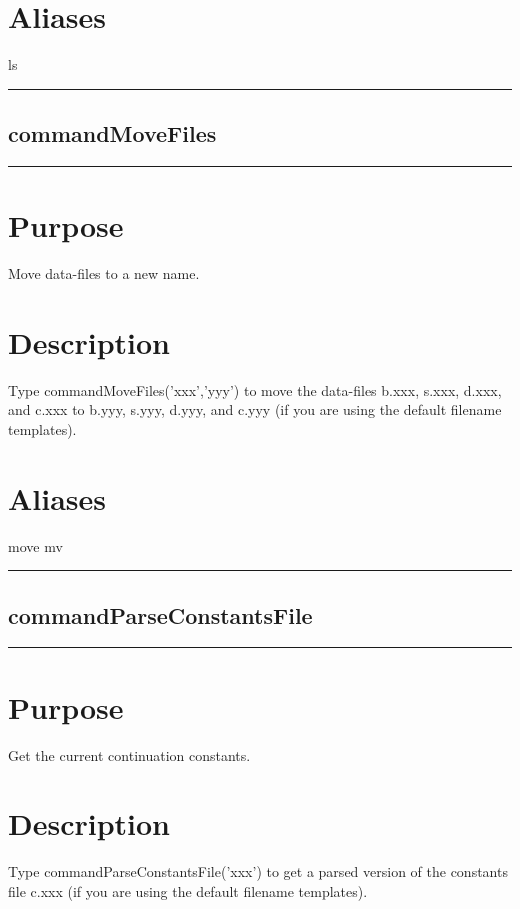 \documentclass[12pt]{report}
\begin{document}
\begin{minipage}{6in}
    \section*{Aliases}
ls \medskip\hrule\end{minipage}\subsection{commandMoveFiles} \label{sec:clui_ref_commandMoveFiles}\begin{minipage}{6in}\hrule\medskip\section*{Purpose}
Move data-files to a new name.\section*{Description}

    Type commandMoveFiles('xxx','yyy') to move the data-files b.xxx, s.xxx, d.xxx,
    and c.xxx to b.yyy, s.yyy, d.yyy, and c.yyy (if you are using the
    default filename templates).  \section*{Aliases}
move mv \medskip\hrule\end{minipage}\subsection{commandParseConstantsFile} \label{sec:clui_ref_commandParseConstantsFile}\begin{minipage}{6in}\hrule\medskip\section*{Purpose}
Get the current continuation constants.\section*{Description}

    Type commandParseConstantsFile('xxx') to get a parsed version of the constants file
    c.xxx (if you are using the default filename templates).

\end{minipage}
\end{document}
